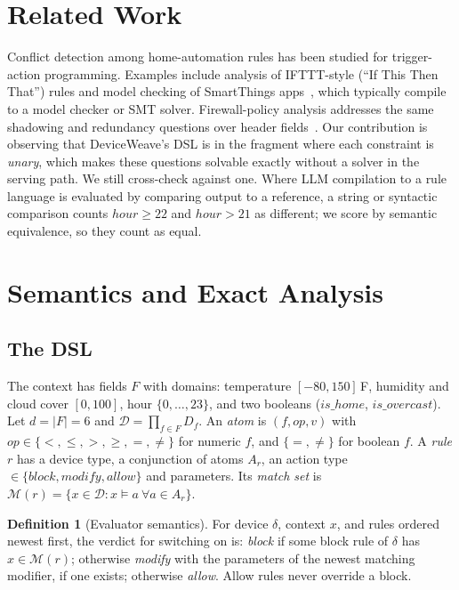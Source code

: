 \documentclass[conference]{IEEEtran}
\theoremstyle{definition}
\newtheorem{definition}{Definition}
\newcommand{\M}{\mathcal{M}}
\begin{document}
\section{Related Work}
Conflict detection among home-automation rules has been studied for trigger-action programming. Examples include analysis of IFTTT-style (``If This Then That'') rules and model checking of SmartThings apps~\cite{celik2018,nguyen2018}, which typically compile to a model checker or SMT solver. Firewall-policy analysis addresses the same shadowing and redundancy questions over header fields~\cite{alshaer2004}. Our contribution is observing that DeviceWeave's DSL is in the fragment where each constraint is \emph{unary}, which makes these questions solvable exactly without a solver in the serving path. We still cross-check against one. Where LLM compilation to a rule language is evaluated by comparing output to a reference, a string or syntactic comparison counts $\mathit{hour}\ge22$ and $\mathit{hour}>21$ as different; we score by semantic equivalence, so they count as equal.

\section{Semantics and Exact Analysis}\label{sec:theory}
\subsection{The DSL}
The context has fields $F$ with domains: temperature $[-80,150]$\,\textdegree F, humidity and cloud cover $[0,100]$, hour $\{0,\dots,23\}$, and two booleans ($\mathit{is\_home}$, $\mathit{is\_overcast}$). Let $d=|F|=6$ and $\mathcal D=\prod_{f\in F}D_f$. An \emph{atom} is $(f,\mathit{op},v)$ with $\mathit{op}\in\{<,\le,>,\ge,=,\ne\}$ for numeric $f$, and $\{=,\ne\}$ for boolean $f$. A \emph{rule} $r$ has a device type, a conjunction of atoms $A_r$, an action type $\in\{\mathit{block},\mathit{modify},\mathit{allow}\}$ and parameters. Its \emph{match set} is $\M(r)=\{x\in\mathcal D: x\models a\ \forall a\in A_r\}$.

\begin{definition}[Evaluator semantics]\label{def:sem}
For device $\delta$, context $x$, and rules ordered newest first, the verdict for switching on is: \emph{block} if some block rule of $\delta$ has $x\in\M(r)$; otherwise \emph{modify} with the parameters of the newest matching modifier, if one exists; otherwise \emph{allow}. Allow rules never override a block.
\end{definition}
\end{document}
